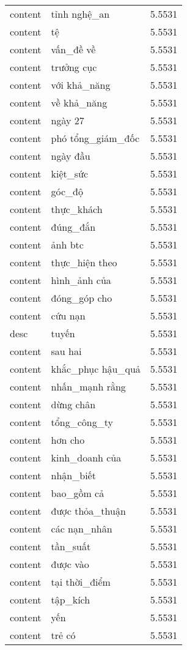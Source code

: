 \documentclass{article}
\begin{document}
\begin{tabular}{lll}
content & tỉnh nghệ\_an & 5.5531\\
content & tệ & 5.5531\\
content & vấn\_đề về & 5.5531\\
content & trưởng cục & 5.5531\\
content & với khả\_năng & 5.5531\\
content & về khả\_năng & 5.5531\\
content & ngày 27 & 5.5531\\
content & phó tổng\_giám\_đốc & 5.5531\\
content & ngày đầu & 5.5531\\
content & kiệt\_sức & 5.5531\\
content & góc\_độ & 5.5531\\
content & thực\_khách & 5.5531\\
content & đúng\_đắn & 5.5531\\
content & ảnh btc & 5.5531\\
content & thực\_hiện theo & 5.5531\\
content & hình\_ảnh của & 5.5531\\
content & đóng\_góp cho & 5.5531\\
content & cứu nạn & 5.5531\\
desc & tuyến & 5.5531\\
content & sau hai & 5.5531\\
content & khắc\_phục hậu\_quả & 5.5531\\
content & nhấn\_mạnh rằng & 5.5531\\
content & dừng chân & 5.5531\\
content & tổng\_công\_ty & 5.5531\\
content & hơn cho & 5.5531\\
content & kinh\_doanh của & 5.5531\\
content & nhận\_biết & 5.5531\\
content & bao\_gồm cả & 5.5531\\
content & được thỏa\_thuận & 5.5531\\
content & các nạn\_nhân & 5.5531\\
content & tần\_suất & 5.5531\\
content & được vào & 5.5531\\
content & tại thời\_điểm & 5.5531\\
content & tập\_kích & 5.5531\\
content & yến & 5.5531\\
content & trẻ có & 5.5531\\

\end{tabular}
\end{document}
